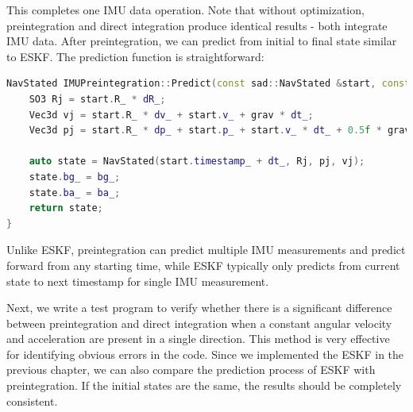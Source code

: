 This completes one IMU data operation. Note that without optimization, preintegration and direct integration produce identical results - both integrate IMU data. After preintegration, we can predict from initial to final state similar to ESKF. The prediction function is straightforward:

\begin{lstlisting}[language=c++,caption=src/ch4/imu\_preintegraion.cc]
NavStated IMUPreintegration::Predict(const sad::NavStated &start, const Vec3d &grav) {
	SO3 Rj = start.R_ * dR_;
	Vec3d vj = start.R_ * dv_ + start.v_ + grav * dt_;
	Vec3d pj = start.R_ * dp_ + start.p_ + start.v_ * dt_ + 0.5f * grav * dt_ * dt_;
	
	auto state = NavStated(start.timestamp_ + dt_, Rj, pj, vj);
	state.bg_ = bg_;
	state.ba_ = ba_;
	return state;
}
\end{lstlisting}

Unlike ESKF, preintegration can predict multiple IMU measurements and predict forward from any starting time, while ESKF typically only predicts from current state to next timestamp for single IMU measurement.

Next, we write a test program to verify whether there is a significant difference between preintegration and direct integration when a constant angular velocity and acceleration are present in a single direction. This method is very effective for identifying obvious errors in the code. Since we implemented the ESKF in the previous chapter, we can also compare the prediction process of ESKF with preintegration. If the initial states are the same, the results should be completely consistent.


